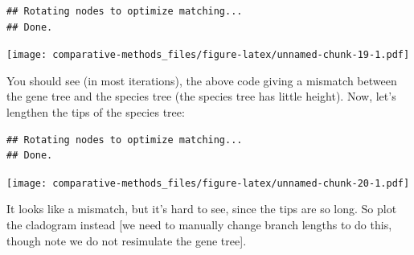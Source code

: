 \documentclass[]{book}
\newenvironment{Shaded}{\begin{snugshade}}{\end{snugshade}}
\newcommand{\KeywordTok}[1]{\textcolor[rgb]{0.13,0.29,0.53}{\textbf{{#1}}}}
\newcommand{\DecValTok}[1]{\textcolor[rgb]{0.00,0.00,0.81}{{#1}}}
\newcommand{\StringTok}[1]{\textcolor[rgb]{0.31,0.60,0.02}{{#1}}}
\newcommand{\NormalTok}[1]{{#1}}
\theoremstyle{definition}
\theoremstyle{definition}
\theoremstyle{remark}
\begin{document}
\begin{verbatim}
## Rotating nodes to optimize matching...
## Done.
\end{verbatim}

\texttt{[image: comparative-methods\_files/figure-latex/unnamed-chunk-19-1.pdf]}

You should see (in most iterations), the above code giving a mismatch
between the gene tree and the species tree (the species tree has little
height). Now, let's lengthen the tips of the species tree:

\begin{Shaded}
\end{Shaded}

\begin{verbatim}
## Rotating nodes to optimize matching...
## Done.
\end{verbatim}

\texttt{[image: comparative-methods\_files/figure-latex/unnamed-chunk-20-1.pdf]}

It looks like a mismatch, but it's hard to see, since the tips are so
long. So plot the cladogram instead {[}we need to manually change branch
lengths to do this, though note we do not resimulate the gene tree{]}.

\begin{Shaded}
\end{Shaded}
\end{document}
